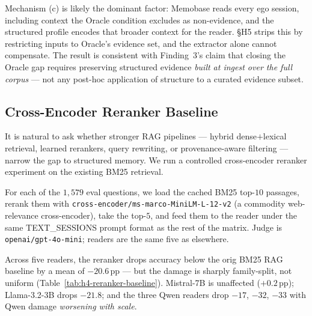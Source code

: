 Mechanism (c) is likely the dominant factor: Memobase reads every ego session, including context the Oracle condition excludes as non-evidence, and the structured profile encodes that broader context for the reader. \S H5 strips this by restricting inputs to Oracle's evidence set, and the extractor alone cannot compensate. The result is consistent with Finding~3's claim that closing the Oracle gap requires preserving structured evidence \emph{built at ingest over the full corpus} --- not any post-hoc application of structure to a curated evidence subset.

\subsection{Cross-Encoder Reranker Baseline}
\label{app:h4-reranker-baseline}

It is natural to ask whether stronger RAG pipelines --- hybrid dense$+$lexical retrieval, learned rerankers, query rewriting, or provenance-aware filtering --- narrow the gap to structured memory. We run a controlled cross-encoder reranker experiment on the existing BM25 retrieval.

For each of the $1{,}579$ eval questions, we load the cached BM25 top-$10$ passages, rerank them with \texttt{cross-encoder/ms-marco-MiniLM-L-12-v2} (a commodity web-relevance cross-encoder), take the top-$5$, and feed them to the reader under the same TEXT\_SESSIONS prompt format as the rest of the matrix. Judge is \texttt{openai/gpt-4o-mini}; readers are the same five as elsewhere.

Across five readers, the reranker drops accuracy below the orig BM25 RAG baseline by a mean of $-20.6$\,pp --- but the damage is sharply family-split, not uniform (Table~\ref{tab:h4-reranker-baseline}). Mistral-7B is unaffected ($+0.2$\,pp); Llama-3.2-3B drops $-21.8$; and the three Qwen readers drop $-17$, $-32$, $-33$ with Qwen damage \emph{worsening with scale}.

